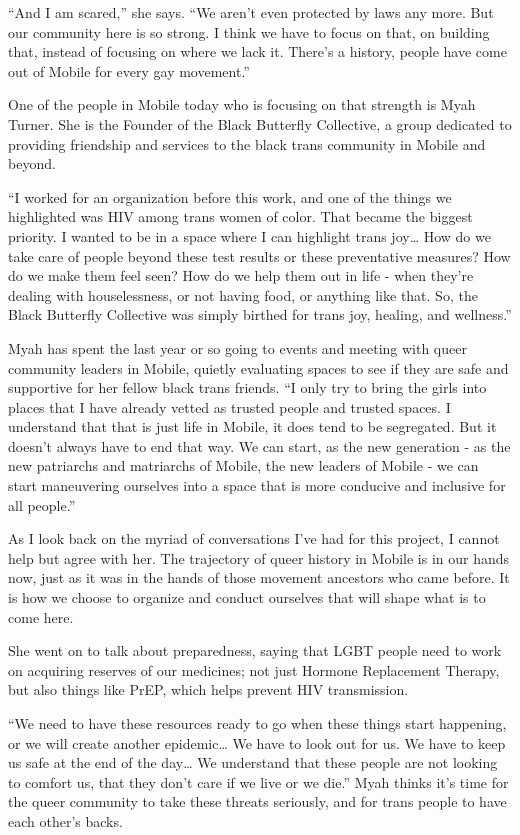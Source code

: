 \documentclass[
]{book}
\begin{document}
``And I am scared,'' she says. ``We aren't even protected by laws any more. But our community here is so strong. I think we have to focus on that, on building that, instead of focusing on where we lack it. There's a history, people have come out of Mobile for every gay movement.''

One of the people in Mobile today who is focusing on that strength is Myah Turner. She is the Founder of the Black Butterfly Collective, a group dedicated to providing friendship and services to the black trans community in Mobile and beyond.

``I worked for an organization before this work, and one of the things we highlighted was HIV among trans women of color. That became the biggest priority. I wanted to be in a space where I can highlight trans joy\ldots{} How do we take care of people beyond these test results or these preventative measures? How do we make them feel seen? How do we help them out in life - when they're dealing with houselessness, or not having food, or anything like that. So, the Black Butterfly Collective was simply birthed for trans joy, healing, and wellness.''

Myah has spent the last year or so going to events and meeting with queer community leaders in Mobile, quietly evaluating spaces to see if they are safe and supportive for her fellow black trans friends. ``I only try to bring the girls into places that I have already vetted as trusted people and trusted spaces. I understand that that is just life in Mobile, it does tend to be segregated. But it doesn't always have to end that way. We can start, as the new generation - as the new patriarchs and matriarchs of Mobile, the new leaders of Mobile - we can start maneuvering ourselves into a space that is more conducive and inclusive for all people.''

As I look back on the myriad of conversations I've had for this project, I cannot help but agree with her. The trajectory of queer history in Mobile is in our hands now, just as it was in the hands of those movement ancestors who came before. It is how we choose to organize and conduct ourselves that will shape what is to come here.

She went on to talk about preparedness, saying that LGBT people need to work on acquiring reserves of our medicines; not just Hormone Replacement Therapy, but also things like PrEP, which helps prevent HIV transmission.

``We need to have these resources ready to go when these things start happening, or we will create another epidemic\ldots{} We have to look out for us. We have to keep us safe at the end of the day\ldots{} We understand that these people are not looking to comfort us, that they don't care if we live or we die.'' Myah thinks it's time for the queer community to take these threats seriously, and for trans people to have each other's backs.
\end{document}
